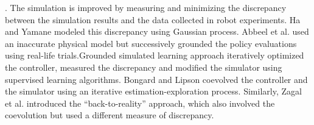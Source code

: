 . The simulation is improved by measuring and minimizing the discrepancy between the simulation results and the data collected in robot experiments. Ha and Yamane \cite{HA:2015} modeled this discrepancy using Gaussian process. Abbeel et al. \cite{Abbeel:2006} used an inaccurate physical model but successively grounded the policy evaluations using real-life trials.Grounded simulated learning approach \cite{Farchy:2013} iteratively optimized the controller, measured the discrepancy and modified the simulator using supervised learning algorithms. Bongard and Lipson \cite{BongardL05} coevolved the controller and the simulator using an iterative estimation-exploration process. Similarly, Zagal et al. \cite{zagal2004} introduced the ``back-to-reality'' approach, which also involved the coevolution but used a different measure of discrepancy.
